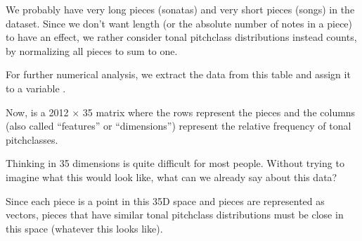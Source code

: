 \documentclass[letterpaper,10pt,english]{sphinxmanual}
\begin{document}
We probably have very long pieces (sonatas) and very short pieces
(songs) in the dataset. Since we don’t want length (or the absolute
number of notes in a piece) to have an effect, we rather consider tonal
pitch\sphinxhyphen{}class distributions instead counts, by normalizing all pieces to
sum to one.

\begin{sphinxVerbatim}[commandchars=\\\{\}]
   
\end{sphinxVerbatim}



For further numerical analysis, we extract the data from this table and
assign it to a variable .

\begin{sphinxVerbatim}[commandchars=\\\{\}]
  

 
\end{sphinxVerbatim}

\begin{sphinxVerbatim}[commandchars=\\\{\}]
 
\end{sphinxVerbatim}

Now,  is a 2012 \(\times\) 35 matrix where the rows represent
the pieces and the columns (also called “features” or “dimensions”)
represent the relative frequency of tonal pitch\sphinxhyphen{}classes.

Thinking in 35 dimensions is quite difficult for most people. Without
trying to imagine what this would look like, what can we already say
about this data?

Since each piece is a point in this 35\sphinxhyphen{}D space and pieces are
represented as vectors, pieces that have similar tonal pitch\sphinxhyphen{}class
distributions must be close in this space (whatever this looks like).
\end{document}
